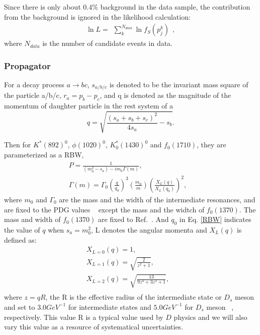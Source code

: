 {    Since there is only about $0.4\%$ background in the data sample, the contribution from the background is ignored in the likelihood calculation:
    \begin{equation}
    \ln L = \begin{matrix}\sum_{k}^{N_{data}} \ln f_{S}(p_{j}^{k})\end{matrix},  \label{likelihood}
    \end{equation}
    where $N_{data}$ is the number of candidate events in data.


    \subsubsection{Propagator}
    \par{
        For a decay process $a \rightarrow bc$, $s_{a/b/c}$ is denoted to be the invariant mass square of the particle a/b/c, $r_{a}=p_{b}-p_{c}$, and q is denoted as the magnitude of the momentum of daughter particle in the rest system of a
        \begin{equation}
            q=\sqrt{ \frac{(s_{a} + s_{b} + s_{c})^{2}}{4s_{a}} - s_{b}}. \label{base-q}
        \end{equation}

        Then for $K^{*}(892)^{0}$, $\phi(1020)^{0}$, $K_{0}^{*}(1430)^{0}$ and  $f_{0}(1710)$, they are parameterized as a RBW,
        \begin{equation}
            \begin{array}{lr}
                P = \frac{1}{(m_{0}^{2} - s_{a} ) - im_{0}\Gamma(m)}, &\\
                \Gamma(m) = \Gamma_{0}\left(\frac{q}{q_{0}}\right)^{3}\left(\frac{m_{0}}{m}\right)\left(\frac{X_{L}(q)}{X_{L}(q_{0})}\right)^{2}, &
            \end{array}\label{RBW} 
        \end{equation}
        where $m_{0}$ and $\Gamma_{0}$ are the mass and the width of the intermediate resonances, and are fixed to the PDG values ~\cite{PDG2018} except the mass and the widtch of $f_{0}(1370)$. The mass and width of $f_{0}(1370)$ are fixed to Ref.~\cite{para-f01370}.
        And $q_{0}$ in Eq. \ref{RBW} indicates the value of $q$ when $s_{a}=m_{0}^{2}$, L denotes the angular momenta and $X_{L}(q)$ is defined as:
        \begin{equation}
            \begin{array}{lr}
                X_{L=0}(q) = 1,       &\\
                X_{L=1}(q) = \sqrt{\frac{2}{z^{2}+1}},       &\\
                X_{L=2}(q) = \sqrt{\frac{13}{9z^{4}+3z^{2}+1}},       &\\
            \end{array}\label{XLQ} 
        \end{equation}
        where $z=qR$, the R is the effective radius of the intermediate state or $D_{s}$ meson and set to $3.0GeV^{-1}$ for intermediate states and $5.0GeV^{-1}$  for $D_{s}$ meson ~\cite{Doc-DB-416-v30}, respectively.
        This value R is a typical value used by $D$ physics and we will also vary this value as a resource of systematical uncertainties.

}}
